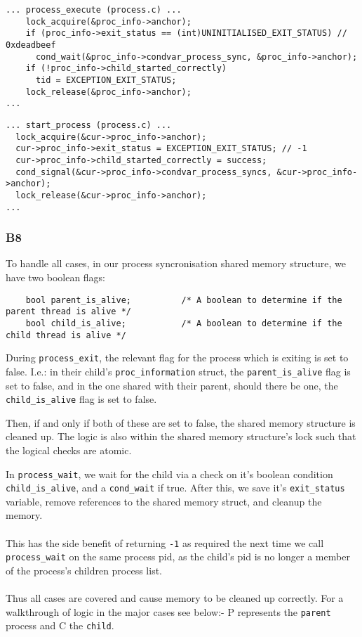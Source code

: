 \documentclass[a4wide, 11pt]{article}
\newcommand{\tx}{\texttt}
\begin{document}
\begin{verbatim}
... process_execute (process.c) ...
    lock_acquire(&proc_info->anchor);
    if (proc_info->exit_status == (int)UNINITIALISED_EXIT_STATUS) // 0xdeadbeef
      cond_wait(&proc_info->condvar_process_sync, &proc_info->anchor);
    if (!proc_info->child_started_correctly)
      tid = EXCEPTION_EXIT_STATUS;
    lock_release(&proc_info->anchor);
...
\end{verbatim}

\begin{verbatim}
... start_process (process.c) ...
  lock_acquire(&cur->proc_info->anchor);
  cur->proc_info->exit_status = EXCEPTION_EXIT_STATUS; // -1
  cur->proc_info->child_started_correctly = success;
  cond_signal(&cur->proc_info->condvar_process_syncs, &cur->proc_info->anchor);
  lock_release(&cur->proc_info->anchor);
...
\end{verbatim}

\subsubsection{B8}

To handle all cases, in our process syncronisation shared memory structure, we have two boolean flags:

\begin{verbatim}
    bool parent_is_alive;          /* A boolean to determine if the parent thread is alive */
    bool child_is_alive;           /* A boolean to determine if the child thread is alive */
\end{verbatim}

During \tx{process\_exit}, the relevant flag for the process which is exiting is set to false. I.e.: in their child's \tx{proc\_information} struct, the \tx{parent\_is\_alive} flag is set to false, and in the one shared with their parent, should there be one, the \tx{child\_is\_alive} flag is set to false.

Then, if and only if both of these are set to false, the shared memory structure is cleaned up. The logic is also within the shared memory structure's lock such that the logical checks are atomic.

In \tx{process\_wait}, we wait for the child via a check on it's boolean condition \texttt{child\_is\_alive}, and a \texttt{cond\_wait} if true. After this, we save it's \texttt{exit\_status} variable, remove references to the shared memory struct, and cleanup the memory.
\\\\
This has the side benefit of returning \tx{-1} as required the next time we call \texttt{process\_wait} on the same process pid, as the child's pid is no longer a member of the process's children process list.
\\\\
Thus all cases are covered and cause memory to be cleaned up correctly. For a walkthrough of logic in the major cases see below:- P represents the \texttt{parent} process and C the \texttt{child}.
\end{document}
